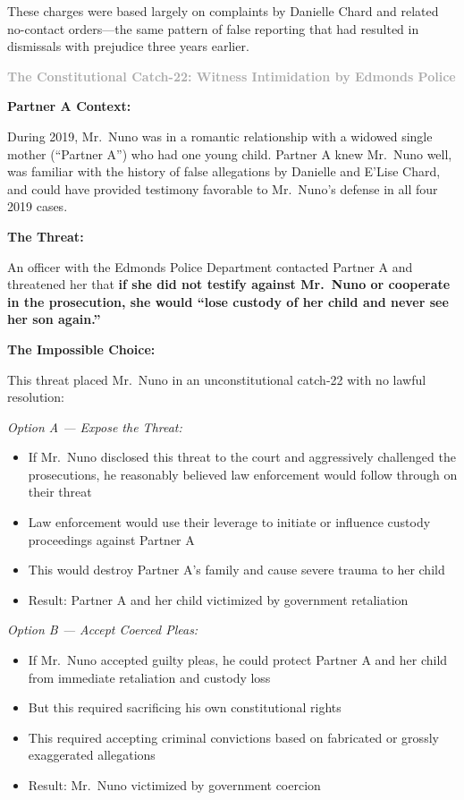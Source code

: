 \documentclass[11pt, letterpaper]{article}
\newcommand{\subsubsectiontitle}[1]{\vspace{0.1in}\noindent\textcolor{DarkGray}{\textbf{#1}}\vspace{0.05in}}
\begin{document}
These charges were based largely on complaints by Danielle Chard and related no-contact orders---the same pattern of false reporting that had resulted in dismissals with prejudice three years earlier.

\subsubsectiontitle{The Constitutional Catch-22: Witness Intimidation by Edmonds Police}

\textbf{Partner A Context:}

During 2019, Mr.\ Nuno was in a romantic relationship with a widowed single mother (``Partner A'') who had one young child. Partner A knew Mr.\ Nuno well, was familiar with the history of false allegations by Danielle and E'Lise Chard, and could have provided testimony favorable to Mr.\ Nuno's defense in all four 2019 cases.

\textbf{The Threat:}

An officer with the Edmonds Police Department contacted Partner A and threatened her that \textbf{if she did not testify against Mr.\ Nuno or cooperate in the prosecution, she would ``lose custody of her child and never see her son again.''}

\textbf{The Impossible Choice:}

This threat placed Mr.\ Nuno in an unconstitutional catch-22 with no lawful resolution:

\textit{Option A --- Expose the Threat:}
\begin{itemize}[leftmargin=*,itemsep=2pt]
    \item If Mr.\ Nuno disclosed this threat to the court and aggressively challenged the prosecutions, he reasonably believed law enforcement would follow through on their threat
    \item Law enforcement would use their leverage to initiate or influence custody proceedings against Partner A
    \item This would destroy Partner A's family and cause severe trauma to her child
    \item Result: Partner A and her child victimized by government retaliation
\end{itemize}

\textit{Option B --- Accept Coerced Pleas:}
\begin{itemize}[leftmargin=*,itemsep=2pt]
    \item If Mr.\ Nuno accepted guilty pleas, he could protect Partner A and her child from immediate retaliation and custody loss
    \item But this required sacrificing his own constitutional rights
    \item This required accepting criminal convictions based on fabricated or grossly exaggerated allegations
    \item Result: Mr.\ Nuno victimized by government coercion
\end{itemize}
\end{document}
